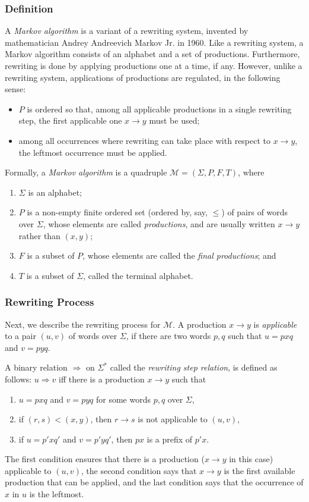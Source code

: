 \documentclass[12pt]{article}
\begin{document}
\subsubsection*{Definition}

A \emph{Markov algorithm} is a variant of a rewriting system, invented by mathematician Andrey Andreevich Markov Jr. in 1960.  Like a rewriting system, a Markov algorithm consists of an alphabet and a set of productions.  Furthermore, rewriting is done by applying productions one at a time, if any.  However, unlike a rewriting system, applications of productions are regulated, in the following sense:
\begin{itemize}
\item $P$ is ordered so that, among all applicable productions in a single rewriting step, the first applicable one $x\to y$ must be used;
\item among all occurrences where rewriting can take place with respect to $x\to y$, the leftmost occurrence must be applied.
\end{itemize}
Formally, a \emph{Markov algorithm} is a quadruple $\mathscr{M}=(\Sigma,P,F,T)$, where 
\begin{enumerate}
\item $\Sigma$ is an alphabet;
\item $P$ is a non-empty finite ordered set (ordered by, say, $\le$) of pairs of words over $\Sigma$, whose elements are called \emph{productions}, and are usually written $x\to y$ rather than $(x,y)$;
\item $F$ is a subset of $P$, whose elements are called the \emph{final productions}; and
\item $T$ is a subset of $\Sigma$, called the terminal alphabet.
\end{enumerate}

\subsubsection*{Rewriting Process}

Next, we describe the rewriting process for $\mathscr{M}$.  A production $x\to y$ is \emph{applicable} to a pair $(u,v)$ of words over $\Sigma$, if there are two words $p,q$ such that $u=pxq$ and $v=pyq$.

A binary relation $\Rightarrow$ on $\Sigma^*$ called the \emph{rewriting step relation}, is defined as follows: $u\Rightarrow v$ iff there is a production $x\to y$ such that
\begin{enumerate}
\item $u=pxq$ and $v=pyq$ for some words $p,q$ over $\Sigma$,
\item if $(r,s)< (x,y)$, then $r\to s$ is not applicable to $(u,v)$,
\item if $u=p'xq'$ and $v=p'yq'$, then $px$ is a prefix of $p'x$.
\end{enumerate}
The first condition ensures that there is a production ($x\to y$ in this case) applicable to $(u,v)$, the second condition says that $x\to y$ is the first available production that can be applied, and the last condition says that the occurrence of $x$ in $u$ is the leftmost.
\end{document}
